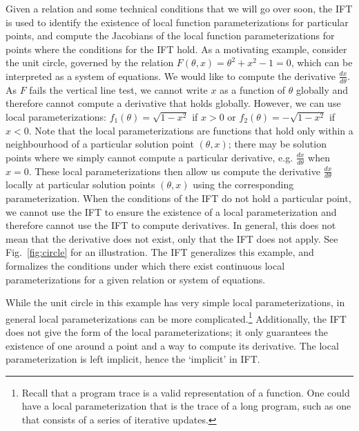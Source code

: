 \documentclass[11pt]{article}
\begin{document}
Given a relation and some technical conditions that we will go over soon,
the IFT is used to identify the existence of local
function parameterizations for particular points,
and compute the Jacobians of the local function parameterizations for points
where the conditions for the IFT hold.
As a motivating example, consider the unit circle,
governed by the relation $F(\theta,x) = \theta^2 + x^2 - 1 = 0$,
which can be interpreted as a system of equations.
We would like to compute the derivative $\frac{dx}{d\theta}$.
As $F$ fails the vertical line test, we cannot write $x$ as a function of $\theta$ globally
and therefore cannot compute a derivative that holds globally.
However, we can use local parameterizations: $f_1(\theta) = \sqrt{1-x^2}$ if $x > 0$
or $f_2(\theta) = -\sqrt{1-x^2}$ if $x<0$.
Note that the local parameterizations are functions that hold
only within a neighbourhood of a particular solution point $(\theta,x)$;
there may be solution points where we simply cannot compute a particular derivative,
e.g. $\frac{dx}{d\theta}$ when $x=0$.
These local parameterizations then allow us compute the derivative $\frac{dx}{d\theta}$
locally at particular solution points $(\theta,x)$ using the corresponding parameterization.
When the conditions of the IFT do not hold a particular point,
we cannot use the IFT to ensure the existence of a local parameterization
and therefore cannot use the IFT to compute derivatives.
In general, this does not mean that the derivative does not exist,
only that the IFT does not apply.
See Fig.~\ref{fig:circle} for an illustration.
The IFT generalizes this example, and formalizes the conditions under which there exist
continuous local parameterizations for a given relation or system of equations.

While the unit circle in this example has very simple local parameterizations,
in general local parameterizations can be more complicated.\footnote{
Recall that a program trace is a valid representation of a function.
One could have a local parameterization that is the trace of a long program,
such as one that consists of a series of iterative updates.
}
Additionally, the IFT does not give the form of the local parameterizations;
it only guarantees the existence of one around a point and a way to compute its derivative.
The local parameterization is left implicit, hence the `implicit' in IFT.
\end{document}
